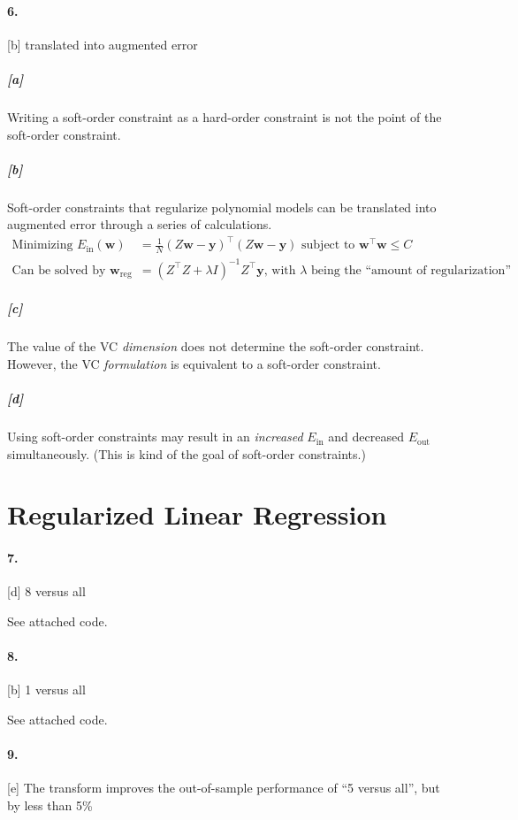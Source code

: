\documentclass[titlepage]{article}
\newcommand*{\tran}{\intercal}
\newcommand*{\reg}{\text{reg}}
\begin{document}
\paragraph{6.} [b] translated into augmented error

	\subparagraph{[a]} Writing a soft-order constraint as a hard-order constraint is not the point of the soft-order constraint.

	\subparagraph{[b]} Soft-order constraints that regularize polynomial models can be translated into augmented error through a series of calculations. 
	\begin{align*}
	\text{Minimizing } E_{\text{in}}(\bm w) &= \frac{1}{N} (Z\bm w - \bm y)^\tran(Z\bm w - \bm y) \text{ subject to } \bm w^\tran \bm w \leq C \\
	\text{Can be solved by }\bm w_{\reg} &= (Z^\tran Z + \lambda I )^{-1}Z^\tran \bm y \text{, with $\lambda$ being the ``amount of regularization''}
	\end{align*}
	
	\subparagraph{[c]} The value of the VC \textit{dimension} does not determine the soft-order constraint. However, the VC \textit{formulation} is equivalent to a soft-order constraint. 
	
	\subparagraph{[d]} Using soft-order constraints may result in an \textit{increased} $E_{\text{in}}$ and decreased $E_{\text{out}}$ simultaneously. (This is kind of the goal of soft-order constraints.)

\section*{Regularized Linear Regression}
\paragraph{7.} [d] 8 versus all

	See attached code.

\paragraph{8.} [b] 1 versus all

	See attached code.

\paragraph{9.} [e] The transform improves the out-of-sample performance of ``5 versus all'', but by less than 5\%
\end{document}
